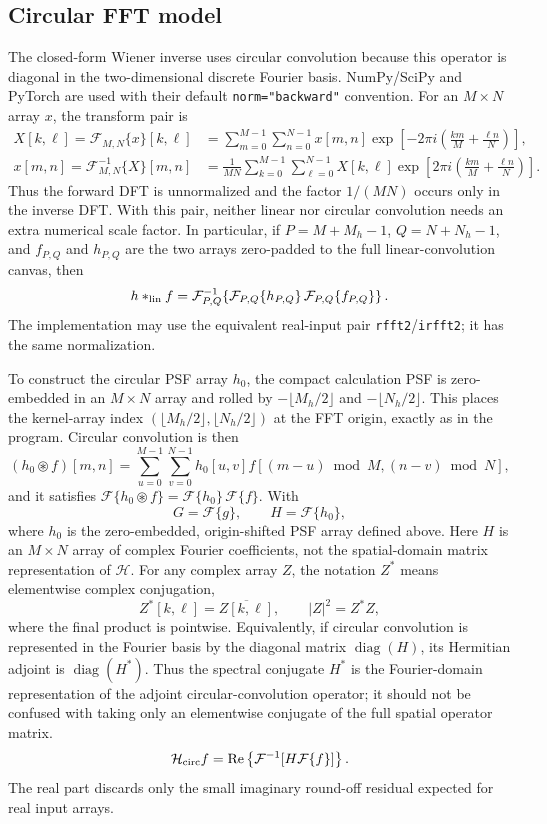 \documentclass[10pt,a4paper]{article}
\newcommand{\code}[1]{\texttt{#1}}
\newcommand{\calF}{\mathcal{F}}
\begin{document}
\subsection{Circular FFT model}
The closed-form Wiener inverse uses circular convolution because this operator is diagonal in the two-dimensional discrete Fourier basis. NumPy/SciPy and PyTorch are used with their default \code{norm="backward"} convention. For an $M\times N$ array $x$, the transform pair is
\begin{align*}
X[k,\ell]=\calF_{M,N}\{x\}[k,\ell]
&=\sum_{m=0}^{M-1}\sum_{n=0}^{N-1}
 x[m,n]\exp\!\left[-2\pi i\left(\frac{km}{M}+\frac{\ell n}{N}\right)\right],\\
x[m,n]=\calF_{M,N}^{-1}\{X\}[m,n]
&=\frac{1}{MN}\sum_{k=0}^{M-1}\sum_{\ell=0}^{N-1}
 X[k,\ell]\exp\!\left[2\pi i\left(\frac{km}{M}+\frac{\ell n}{N}\right)\right].
\end{align*}
Thus the forward DFT is unnormalized and the factor $1/(MN)$ occurs only in the inverse DFT. With this pair, neither linear nor circular convolution needs an extra numerical scale factor. In particular, if $P=M+M_h-1$, $Q=N+N_h-1$, and $f_{P,Q}$ and $h_{P,Q}$ are the two arrays zero-padded to the full linear-convolution canvas, then
\[
h*_{\rm lin}f
=\calF_{P,Q}^{-1}\!\left\{\calF_{P,Q}\{h_{P,Q}\}\,\calF_{P,Q}\{f_{P,Q}\}\right\}.
\]
The implementation may use the equivalent real-input pair \code{rfft2}/\code{irfft2}; it has the same normalization.

To construct the circular PSF array $h_0$, the compact calculation PSF is zero-embedded in an $M\times N$ array and rolled by $-\lfloor M_h/2\rfloor$ and $-\lfloor N_h/2\rfloor$. This places the kernel-array index $(\lfloor M_h/2\rfloor,\lfloor N_h/2\rfloor)$ at the FFT origin, exactly as in the program. Circular convolution is then
\[
(h_0\circledast f)[m,n]
=\sum_{u=0}^{M-1}\sum_{v=0}^{N-1}
 h_0[u,v]f[(m-u)\bmod M,(n-v)\bmod N],
\]
and it satisfies $\calF\{h_0\circledast f\}=\calF\{h_0\}\,\calF\{f\}$. With
\begin{equation}G=\calF\{g\},\qquad H=\calF\{h_0\},\end{equation}
where $h_0$ is the zero-embedded, origin-shifted PSF array defined above. Here $H$ is an $M\times N$ array of complex Fourier coefficients, not the spatial-domain matrix representation of $\mathcal H$. For any complex array $Z$, the notation $Z^{*}$ means elementwise complex conjugation,
\[
Z^{*}[k,\ell]=\overline{Z[k,\ell]},\qquad |Z|^2=Z^{*}Z,
\]
where the final product is pointwise. Equivalently, if circular convolution is represented in the Fourier basis by the diagonal matrix $\operatorname{diag}(H)$, its Hermitian adjoint is $\operatorname{diag}(H^{*})$. Thus the spectral conjugate $H^{*}$ is the Fourier-domain representation of the adjoint circular-convolution operator; it should not be confused with taking only an elementwise conjugate of the full spatial operator matrix.
\begin{equation}\mathcal{H}_{\rm circ}f=\operatorname{Re}\left\{\calF^{-1}[H\calF\{f\}]\right\}.\end{equation}
The real part discards only the small imaginary round-off residual expected for real input arrays.
\end{document}
